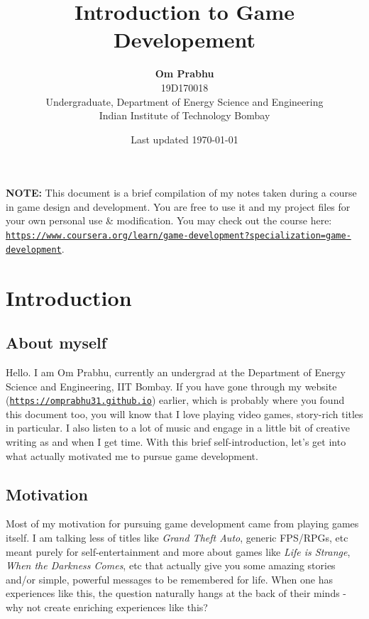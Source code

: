\documentclass{article}[a4paper,12pt]
\title{\textbf{Introduction to Game Developement}}
\author{
	\textbf{Om Prabhu}\\
	19D170018\\
	Undergraduate, Department of Energy Science and Engineering\\
	Indian Institute of Technology Bombay\\}
\date{Last updated \today}
\theoremstyle{definition}
\begin{document}
\maketitle
\vspace{-12pt}
\hrulefill
\vspace{6pt}

\textbf{NOTE:} This document is a brief compilation of my notes taken during a course in game design and development. You are free to use it and my project files for your own personal use \& modification. You may check out the course here: \texttt{\href{https://www.coursera.org/learn/game-development?specialization=game-development}{https://www.coursera.org/learn/game-development?specialization=game-development}}.

\hrulefill
\tableofcontents
\pagebreak

\section{Introduction}
\subsection{About myself}
Hello. I am Om Prabhu, currently an undergrad at the Department of Energy Science and Engineering, IIT Bombay. If you have gone through my website (\texttt{\href{https://omprabhu31.github.io}{https://omprabhu31.github.io}}) earlier, which is probably where you found this document too, you will know that I love playing video games, story-rich titles in particular. I also listen to a lot of music and engage in a little bit of creative writing as and when I get time. With this brief self-introduction, let's get into what actually motivated me to pursue game development.

\subsection{Motivation}
Most of my motivation for pursuing game development came from playing games itself. I am talking less of titles like \textit{Grand Theft Auto}, generic FPS/RPGs, etc meant purely for self-entertainment and more about games like \textit{Life is Strange}, \textit{When the Darkness Comes}, etc that actually give you some amazing stories and/or simple, powerful messages to be remembered for life. When one has experiences like this, the question naturally hangs at the back of their minds - why not create enriching experiences like this?
\vspace{6pt}
\end{document}
